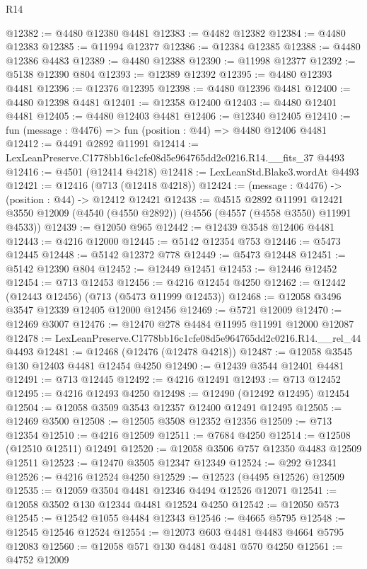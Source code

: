 \begin{lexlean}{R14}
\begin{coremodule}
@12382 := @4480 @12380 @4481
@12383 := @4482 @12382
@12384 := @4480 @12383
@12385 := @11994 @12377
@12386 := @12384 @12385
@12388 := @4480 @12386 @4483
@12389 := @4480 @12388
@12390 := @11998 @12377
@12392 := @5138 @12390 @804
@12393 := @12389 @12392
@12395 := @4480 @12393 @4481
@12396 := @12376 @12395
@12398 := @4480 @12396 @4481
@12400 := @4480 @12398 @4481
@12401 := @12358 @12400
@12403 := @4480 @12401 @4481
@12405 := @4480 @12403 @4481
@12406 := @12340 @12405
@12410 := fun (message : @4476) => fun (position : @44) => @4480 @12406 @4481
@12412 := @4491 @2892 @11991
@12414 := LexLeanPreserve.C1778bb16c1cfe08d5e964765dd2c0216.R14.__fits_37 @4493
@12416 := @4501 (@12414 @4218)
@12418 := LexLeanStd.Blake3.wordAt @4493
@12421 := @12416 (@713 (@12418 @4218))
@12424 := (message : @4476) -> (position : @44) -> @12412 @12421
@12438 := @4515
    @2892
    @11991
    @12421
    @3550
    @12009
    (@4540 (@4550 @2892))
    (@4556 (@4557 (@4558 @3550) @11991 @4533))
@12439 := @12050 @965
@12442 := @12439 @3548 @12406 @4481
@12443 := @4216 @12000
@12445 := @5142 @12354 @753
@12446 := @5473 @12445
@12448 := @5142 @12372 @778
@12449 := @5473 @12448
@12451 := @5142 @12390 @804
@12452 := @12449 @12451
@12453 := @12446 @12452
@12454 := @713 @12453
@12456 := @4216 @12454 @4250
@12462 := @12442 (@12443 @12456) (@713 (@5473 @11999 @12453))
@12468 := @12058 @3496 @3547 @12339 @12405 @12000 @12456
@12469 := @5721 @12009
@12470 := @12469 @3007
@12476 := @12470 @278 @4484 @11995 @11991 @12000 @12087
@12478 := LexLeanPreserve.C1778bb16c1cfe08d5e964765dd2c0216.R14.__rel_44 @4493
@12481 := @12468 (@12476 (@12478 @4218))
@12487 := @12058 @3545 @130 @12403 @4481 @12454 @4250
@12490 := @12439 @3544 @12401 @4481
@12491 := @713 @12445
@12492 := @4216 @12491
@12493 := @713 @12452
@12495 := @4216 @12493 @4250
@12498 := @12490 (@12492 @12495) @12454
@12504 := @12058 @3509 @3543 @12357 @12400 @12491 @12495
@12505 := @12469 @3500
@12508 := @12505 @3508 @12352 @12356
@12509 := @713 @12354
@12510 := @4216 @12509
@12511 := @7684 @4250
@12514 := @12508 (@12510 @12511) @12491
@12520 := @12058 @3506 @757 @12350 @4483 @12509 @12511
@12523 := @12470 @3505 @12347 @12349
@12524 := @292 @12341
@12526 := @4216 @12524 @4250
@12529 := @12523 (@4495 @12526) @12509
@12535 := @12059 @3504 @4481 @12346 @4494 @12526 @12071
@12541 := @12058 @3502 @130 @12344 @4481 @12524 @4250
@12542 := @12050 @573
@12545 := @12542 @1055 @4484 @12343
@12546 := @4665 @5795
@12548 := @12545 @12546 @12524
@12554 := @12073 @603 @4481 @4483 @4664 @5795 @12083
@12560 := @12058 @571 @130 @4481 @4481 @570 @4250
@12561 := @4752 @12009

\end{coremodule}
\end{lexlean}
